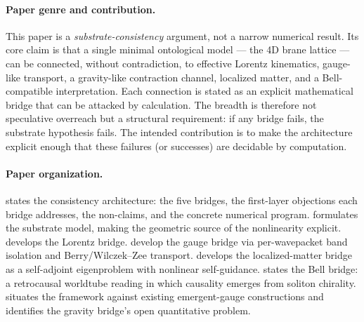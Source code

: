 \paragraph{Paper genre and contribution.}
This paper is a \emph{substrate-consistency} argument, not a narrow numerical result.
Its core claim is that a single minimal ontological model --- the 4D brane lattice --- can be connected, without contradiction, to effective Lorentz kinematics, gauge-like transport, a gravity-like contraction channel, localized matter, and a Bell-compatible interpretation.
Each connection is stated as an explicit mathematical bridge that can be attacked by calculation.
The breadth is therefore not speculative overreach but a structural requirement: if any bridge fails, the substrate hypothesis fails.
The intended contribution is to make the architecture explicit enough that these failures (or successes) are decidable by computation.

\paragraph{Paper organization.}
 states the consistency architecture: the five bridges, the first-layer objections each bridge addresses, the non-claims, and the concrete numerical program.
 formulates the substrate model, making the geometric source of the nonlinearity explicit.
 develops the Lorentz bridge.
 develop the gauge bridge via per-wavepacket band isolation and Berry/Wilczek--Zee transport.
 develops the localized-matter bridge as a self-adjoint eigenproblem with nonlinear self-guidance.
 states the Bell bridge: a retrocausal worldtube reading in which causality emerges from soliton chirality.
 situates the framework against existing emergent-gauge constructions and identifies the gravity bridge's open quantitative problem.

